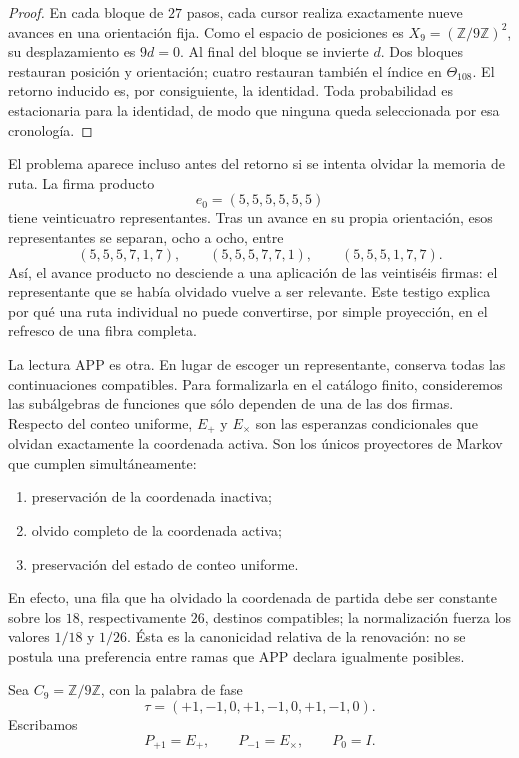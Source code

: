 \begin{proof}
En cada bloque de \(27\) pasos, cada cursor realiza exactamente nueve
avances en una orientación fija. Como el espacio de posiciones es
\(X_9=(\mathbb Z/9\mathbb Z)^2\), su desplazamiento es \(9d=0\). Al final
del bloque se invierte \(d\). Dos bloques restauran posición y orientación;
cuatro restauran también el índice en \(\Theta_{108}\). El retorno inducido
es, por consiguiente, la identidad. Toda probabilidad es estacionaria para
la identidad, de modo que ninguna queda seleccionada por esa cronología.
\end{proof}

El problema aparece incluso antes del retorno si se intenta olvidar la
memoria de ruta. La firma producto
\[
 e_0=(5,5,5,5,5,5)
\]
tiene veinticuatro representantes. Tras un avance en su propia orientación,
esos representantes se separan, ocho a ocho, entre
\[
 (5,5,5,7,1,7),\qquad
 (5,5,5,7,7,1),\qquad
 (5,5,5,1,7,7).
\]
Así, el avance producto no desciende a una aplicación de las veintiséis
firmas: el representante que se había olvidado vuelve a ser relevante. Este
testigo explica por qué una ruta individual no puede convertirse, por simple
proyección, en el refresco de una fibra completa.

La lectura APP es otra. En lugar de escoger un representante, conserva todas
las continuaciones compatibles. Para formalizarla en el catálogo finito,
consideremos las subálgebras de funciones que sólo dependen de una de las dos
firmas. Respecto del conteo uniforme, \(E_+\) y \(E_\times\) son las
esperanzas condicionales que olvidan exactamente la coordenada activa. Son los
únicos proyectores de Markov que cumplen simultáneamente:
\begin{enumerate}
  \item preservación de la coordenada inactiva;
  \item olvido completo de la coordenada activa;
  \item preservación del estado de conteo uniforme.
\end{enumerate}
En efecto, una fila que ha olvidado la coordenada de partida debe ser
constante sobre los \(18\), respectivamente \(26\), destinos compatibles; la
normalización fuerza los valores \(1/18\) y \(1/26\). Ésta es la canonicidad
relativa de la renovación: no se postula una preferencia entre ramas que APP
declara igualmente posibles.

Sea \(C_9=\mathbb Z/9\mathbb Z\), con la palabra de fase
\[
 \tau=(+1,-1,0,+1,-1,0,+1,-1,0).
\]
Escribamos
\[
 P_{+1}=E_+,
 \qquad P_{-1}=E_\times,
 \qquad P_0=I.
\]

